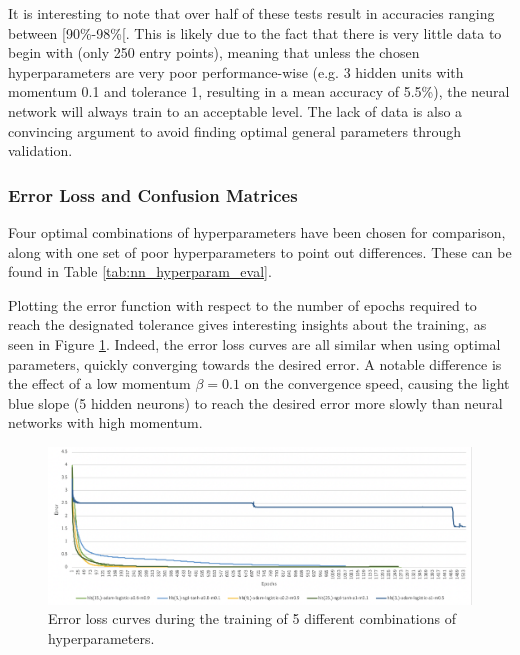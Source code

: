 \documentclass[letterpaper,12pt]{article}
\begin{document}
It is interesting to note that over half of these tests result in accuracies ranging between [90\%-98\%[. This is likely due to the fact that there is very little data to begin with (only 250 entry points), meaning that unless the chosen hyperparameters are very poor performance-wise (e.g. 3 hidden units with momentum 0.1 and tolerance 1, resulting in a mean accuracy of 5.5\%), the neural network will always train to an acceptable level. The lack of data is also a convincing argument to avoid finding optimal general parameters through validation.

\subsubsection{Error Loss and Confusion Matrices}
\label{sec:eval-errorloss-cm}

Four optimal combinations of hyperparameters have been chosen for comparison, along with one set of poor hyperparameters to point out differences. These can be found in Table \ref{tab:nn_hyperparam_eval}.



Plotting the error function with respect to the number of epochs required to reach the designated tolerance gives interesting insights about the training, as seen in Figure \ref{fig:error-loss-curve}. Indeed, the error loss curves are all similar when using optimal parameters, quickly converging towards the desired error. A notable difference is the effect of a low momentum $\beta=0.1$ on the convergence speed, causing the light blue slope (5 hidden neurons) to reach the desired error more slowly than neural networks with high momentum.

\clearpage

\begin{figure}[h] 
\centerline{\includegraphics[width=\textwidth]{report/figures/error_loss_curve.png}}
\caption{\label{fig:error-loss-curve}Error loss curves during the training of 5 different combinations of hyperparameters.}
\end{figure}
\end{document}
